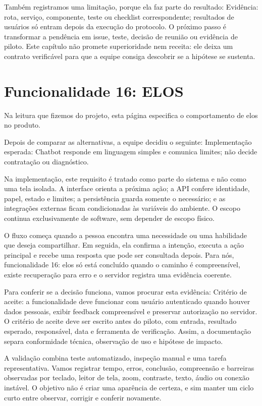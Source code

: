 \documentclass[12pt,oneside,a4paper,article]{abntex2}
\begin{document}
Também registramos uma limitação, porque ela faz parte do resultado: Evidência: rota, serviço, componente, teste ou checklist correspondente; resultados de usuários só entram depois da execução do protocolo. O próximo passo é transformar a pendência em issue, teste, decisão de reunião ou evidência de piloto. Este capítulo não promete superioridade nem receita: ele deixa um contrato verificável para que a equipe consiga descobrir se a hipótese se sustenta.

\section{Funcionalidade 16: ELOS}
Na leitura que fizemos do projeto, esta página especifica o comportamento de elos no produto.

Depois de comparar as alternativas, a equipe decidiu o seguinte: Implementação esperada: Chatbot responde em linguagem simples e comunica limites; não decide contratação ou diagnóstico.

Na implementação, este requisito é tratado como parte do sistema e não como uma tela isolada. A interface orienta a próxima ação; a API confere identidade, papel, estado e limites; a persistência guarda somente o necessário; e as integrações externas ficam condicionadas às variáveis do ambiente. O escopo continua exclusivamente de software, sem depender de escopo físico.

O fluxo começa quando a pessoa encontra uma necessidade ou uma habilidade que deseja compartilhar. Em seguida, ela confirma a intenção, executa a ação principal e recebe uma resposta que pode ser consultada depois. Para nós, funcionalidade 16: elos só está concluído quando o caminho é compreensível, existe recuperação para erro e o servidor registra uma evidência coerente.

Para conferir se a decisão funciona, vamos procurar esta evidência: Critério de aceite: a funcionalidade deve funcionar com usuário autenticado quando houver dados pessoais, exibir feedback compreensível e preservar autorização no servidor. O critério de aceite deve ser escrito antes do piloto, com entrada, resultado esperado, responsável, data e ferramenta de verificação. Assim, a documentação separa conformidade técnica, observação de uso e hipótese de impacto.

A validação combina teste automatizado, inspeção manual e uma tarefa representativa. Vamos registrar tempo, erros, conclusão, compreensão e barreiras observadas por teclado, leitor de tela, zoom, contraste, texto, áudio ou conexão instável. O objetivo não é criar uma aparência de certeza, e sim manter um ciclo curto entre observar, corrigir e conferir novamente.
\end{document}

